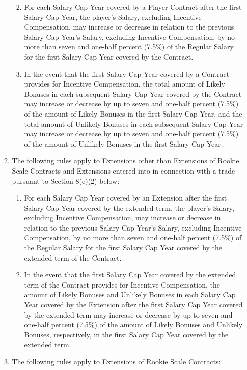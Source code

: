 \documentclass[
]{book}
\providecommand{\tightlist}{%
  \setlength{\itemsep}{0pt}\setlength{\parskip}{0pt}}
\begin{document}
\begin{enumerate}
\begin{enumerate}
    \begin{enumerate}
    \def\labelenumiii{(\roman{enumiii})}
    \tightlist
    \item
      For each Salary Cap Year covered by a Player Contract after the first Salary Cap Year, the player's Salary, excluding Incentive Compensation, may increase or decrease in relation to the previous Salary Cap Year's Salary, excluding Incentive Compensation, by no more than seven and one-half percent (7.5\%) of the Regular Salary for the first Salary Cap Year covered by the Contract.
    \item
      In the event that the first Salary Cap Year covered by a Contract provides for Incentive Compensation, the total amount of Likely Bonuses in each subsequent Salary Cap Year covered by the Contract may increase or decrease by up to seven and one-half percent (7.5\%) of the amount of Likely Bonuses in the first Salary Cap Year, and the total amount of Unlikely Bonuses in each subsequent Salary Cap Year may increase or decrease by up to seven and one-half percent (7.5\%) of the amount of Unlikely Bonuses in the first Salary Cap Year.
    \end{enumerate}
  \item
    The following rules apply to Extensions other than Extensions of Rookie Scale Contracts and Extensions entered into in connection with a trade pursuant to Section 8(e)(2) below:

    \begin{enumerate}
    \def\labelenumiii{(\roman{enumiii})}
    \tightlist
    \item
      For each Salary Cap Year covered by an Extension after the first Salary Cap Year covered by the extended term, the player's Salary, excluding Incentive Compensation, may increase or decrease in relation to the previous Salary Cap Year's Salary, excluding Incentive Compensation, by no more than seven and one-half percent (7.5\%) of the Regular Salary for the first Salary Cap Year covered by the extended term of the Contract.
    \item
      In the event that the first Salary Cap Year covered by the extended term of the Contract provides for Incentive Compensation, the amount of Likely Bonuses and Unlikely Bonuses in each Salary Cap Year covered by the Extension after the first Salary Cap Year covered by the extended term may increase or decrease by up to seven and one-half percent (7.5\%) of the amount of Likely Bonuses and Unlikely Bonuses, respectively, in the first Salary Cap Year covered by the extended term.
    \end{enumerate}
  \item
    The following rules apply to Extensions of Rookie Scale Contracts:


\end{enumerate}
\end{enumerate}
\end{document}
